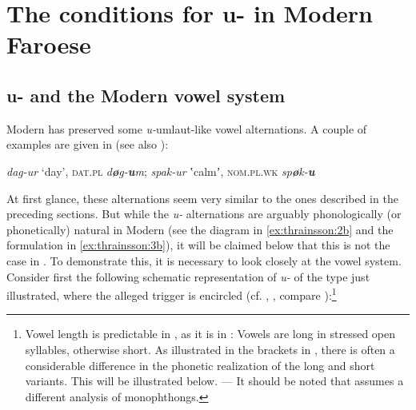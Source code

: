 \documentclass[output=paper,
modfonts
]{LSP/langsci}
\begin{document}
\section{The conditions for {u}- in Modern
Faroese}\label{sec:thrainsson:3}

\subsection{{u-} and the Modern  vowel system}

Modern  has preserved some \emph{u-}umlaut-like vowel
alternations. A couple of examples are given in  (see also
\citealt[78, 100, passim]{thrainsson2012}):

\begin{exe}
\ex \label{ex:thrainsson:11} 	\emph{dag-ur} `day', \textsc{dat.pl}
	\emph{d\textbf{ø}g-\textbf{u}m}; 
	\emph{spak-ur} ʽcalmʼ, \textsc{nom.pl.wk}
	\emph{sp\textbf{ø}k-\textbf{u}}
\z

\noindent At first glance, these alternations seem very similar to the 
ones described in the preceding sections. But while the \emph{u-}
alternations are arguably phonologically (or phonetically) natural in
Modern  (see the diagram in \ref{ex:thrainsson:2b} and the formulation in \ref{ex:thrainsson:3b}),
it will be claimed below that this is not the case in . To
demonstrate this, it is necessary to look closely at the  vowel
system. Consider first the following schematic representation of 
\emph{u-} of the type just illustrated, where the alleged 
trigger is encircled (cf. \citealt[98]{thrainsson2011}, \citealt[33]{thrainsson2012}, compare \citealt[248--250]{arnason2011}):\footnote{Vowel length
  is predictable in , as it is in : Vowels are long in
  stressed open syllables, otherwise short. As illustrated in the
  brackets in , there is often a considerable difference in the
  phonetic realization of the long and short variants. This will be
  illustrated below. --- It should be noted that \citet[76]{arnason2011}
  assumes a different analysis of  monophthongs.}


\end{exe}
\end{document}
